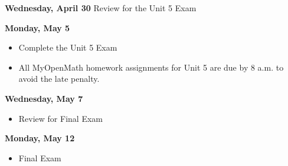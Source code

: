 \documentclass[11pt]{article}
\begin{document}
\textbf{Wednesday, April 30}
Review for the Unit 5 Exam

\textbf{Monday, May 5}

\begin{itemize}
\item Complete the Unit 5 Exam
\item All MyOpenMath homework assignments for Unit 5 are due by 8 a.m. to avoid the late penalty.
\end{itemize}

\textbf{Wednesday, May 7}

\begin{itemize}
\item Review for Final Exam
\end{itemize}

\textbf{Monday, May 12}

\begin{itemize}
\item Final Exam
\end{itemize}
\end{document}
